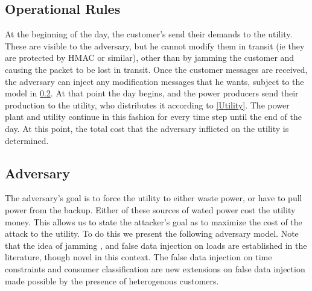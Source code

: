 \documentclass[conference]{IEEEtran}
\begin{document}
\subsection{Operational Rules}
\label{Rules}

At the beginning of the day, the customer's send their demands to the utility. These are visible to the adversary, but he cannot modify them in transit (ie they are protected by HMAC or similar), other than by jamming the customer and causing the packet to be lost in transit.   Once the customer messages are received, the adversary can inject any modification messages that he wants, subject to the model in \ref{Adversary}. At that point the day begins, and the power producers send their production to the utility, who distributes it according to \ref{Utility}. The power plant and utility continue in this fashion for every time step until the end of the day. At this point, the total cost that the adversary inflicted
on the utility is determined.

\subsection{Adversary}
\label{Adversary}

The adversary's goal is to force the utility to either waste power, or have to pull power from the backup. Either of these sources of wated power cost the utility money. This allows us to state the attacker's goal as to maximize the cost of the attack to the utility. To do this we present the following adversary model. Note that the idea of jamming \cite{gupta2010optimal}, and false data injection on loads \cite{lin2012false}\cite{yuan2011modeling} are established in the literature, though novel in this context. The false data injection on time constraints and consumer classification are new extensions on false data injection made possible by the presence of heterogenous customers.
\end{document}
